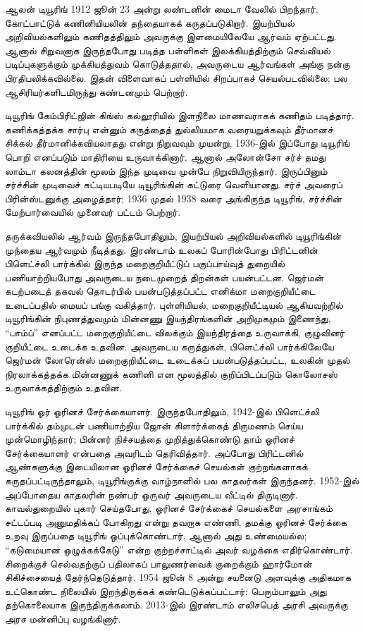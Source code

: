 \documentclass[../../../include/open-logic-section]{subfiles}
\begin{document}


ஆலன் டியூரிங் 1912 ஜூன் 23 அன்று லண்டனின் மைடா வேலில் பிறந்தார்.
கோட்பாட்டுக் கணினியியலின் தந்தையாகக் கருதப்படுகிறார். இயற்பியல்
அறிவியல்களிலும் கணிதத்திலும் அவருக்கு இளமையிலேயே ஆர்வம் ஏற்பட்டது.
ஆனால் சிறுவனாக இருந்தபோது படித்த பள்ளிகள் இலக்கியத்திற்கும்
செவ்வியல் படிப்புகளுக்கும் முக்கியத்துவம் கொடுத்ததால், அவருடைய
ஆர்வங்கள் அங்கு நன்கு பிரதிபலிக்கவில்லை. இதன் விளைவாகப் பள்ளியில்
சிறப்பாகச் செயல்படவில்லை; பல ஆசிரியர்களிடமிருந்து கண்டனமும் பெற்றார்.


டியூரிங் கேம்பிரிட்ஜின் கிங்ஸ் கல்லூரியில் இளநிலை மாணவராகக் கணிதம்
படித்தார். கணிக்கத்தக்க சார்பு என்னும் கருத்தைத் துல்லியமாக வரையறுக்கவும்
தீர்மானச் சிக்கல் தீர்மானிக்கவியலாதது என்று நிறுவவும் முயன்று,
1936-இல் இப்போது டியூரிங் பொறி எனப்படும் மாதிரியை உருவாக்கினார்.
ஆனால் அலோன்சோ சர்ச் தமது லாம்டா கலனத்தின் மூலம் இந்த முடிவை
முன்பே நிறுவியிருந்தார். இருப்பினும் சர்ச்சின் முடிவைச் சுட்டியபடியே
டியூரிங்கின் கட்டுரை வெளியானது. சர்ச் அவரைப் பிரின்ஸ்டனுக்கு அழைத்தார்;
1936 முதல் 1938 வரை அங்கிருந்த டியூரிங், சர்ச்சின் மேற்பார்வையில்
முனைவர் பட்டம் பெற்றார்.

தருக்கவியலில் ஆர்வம் இருந்தபோதிலும், இயற்பியல் அறிவியல்களில்
டியூரிங்கின் முந்தைய ஆர்வமும் நீடித்தது. இரண்டாம் உலகப் போரின்போது
பிரிட்டனின் பிளெட்ச்லி பார்க்கில் இருந்த மறைகுறியீட்டுப் பகுப்பாய்வுத்
துறையில் பணியாற்றியபோது அவருடைய நடைமுறைத் திறன்கள் பயன்பட்டன.
ஜெர்மன் கடற்படைத் தகவல் தொடர்பில் பயன்படுத்தப்பட்ட எனிக்மா
மறைகுறியீட்டை உடைப்பதில் மையப் பங்கு வகித்தார். புள்ளியியல்,
மறைகுறியீட்டியல் ஆகியவற்றில் டியூரிங்கின் நிபுணத்துவமும் மின்னணு
இயந்திரங்களின் அறிமுகமும் இணைந்து, ``பாம்ப்'' எனப்பட்ட மறைகுறியீட்டை
விலக்கும் இயந்திரத்தை உருவாக்கி, குழுவினர் குறியீட்டை உடைக்க
உதவின. அவருடைய கருத்துகள், பிளெட்ச்லி பார்க்கிலேயே ஜெர்மன்
லோரென்ஸ் மறைகுறியீட்டை உடைக்கப் பயன்படுத்தப்பட்ட, உலகின் முதல்
நிரலாக்கத்தக்க மின்னணுக் கணினி என மூலத்தில் குறிப்பிடப்படும்
கொலோசஸ் உருவாக்கத்திற்கும் உதவின.

டியூரிங் ஓர் ஓரினச் சேர்க்கையாளர். இருந்தபோதிலும், 1942-இல்
பிளெட்ச்லி பார்க்கில் தம்முடன் பணியாற்றிய ஜோன் கிளார்க்கைத் திருமணம்
செய்ய முன்மொழிந்தார்; பின்னர் நிச்சயத்தை முறித்துக்கொண்டு தாம்
ஓரினச் சேர்க்கையாளர் என்பதை அவரிடம் தெரிவித்தார். அப்போது
பிரிட்டனில் ஆண்களுக்கு இடையிலான ஓரினச் சேர்க்கைச் செயல்கள்
குற்றங்களாகக் கருதப்பட்டிருந்தாலும், டியூரிங்குக்கு வாழ்நாளில் பல
காதலர்கள் இருந்தனர். 1952-இல் அப்போதைய காதலரின் நண்பர் ஒருவர்
அவருடைய வீட்டில் திருடினார். காவல்துறையில் புகார் செய்தபோது,
ஓரினச் சேர்க்கைச் செயல்களை அரசாங்கம் சட்டப்படி அனுமதிக்கப் போகிறது
என்று தவறாக எண்ணி, தமக்கு ஓரினச் சேர்க்கை உறவு இருப்பதை டியூரிங்
ஒப்புக்கொண்டார். ஆனால் அது உண்மையல்ல; ``கடுமையான ஒழுக்கக்கேடு'' என்ற
குற்றச்சாட்டில் அவர் வழக்கை எதிர்கொண்டார். சிறைக்குச் செல்வதற்குப்
பதிலாகப் பாலுணர்வைக் குறைக்கும் ஹார்மோன் சிகிச்சையைத் தேர்ந்தெடுத்தார்.
1954 ஜூன் 8 அன்று சயனைடு அளவுக்கு அதிகமாக உட்கொண்ட நிலையில்
இறந்திருக்கக் கண்டெடுக்கப்பட்டார்; பெரும்பாலும் அது தற்கொலையாக
இருந்திருக்கலாம். 2013-இல் இரண்டாம் எலிசபெத் அரசி அவருக்கு
அரச மன்னிப்பு வழங்கினார்.
\end{document}
